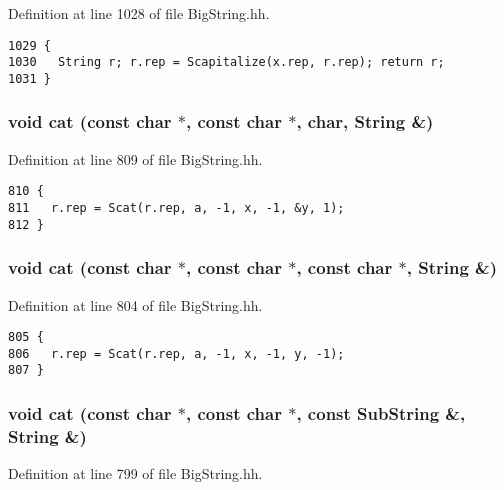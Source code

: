 Definition at line 1028 of file Big\-String.hh.



\footnotesize\begin{verbatim}1029 {
1030   String r; r.rep = Scapitalize(x.rep, r.rep); return r;
1031 }
\end{verbatim}\normalsize 
{}
\subsubsection{\setlength{\rightskip}{0pt plus 5cm}void cat (const char $\ast$, const char $\ast$, char, String \&)\hspace{0.3cm}{\tt  [friend]}}\label{classString_l36}




Definition at line 809 of file Big\-String.hh.



\footnotesize\begin{verbatim}810 {
811   r.rep = Scat(r.rep, a, -1, x, -1, &y, 1);
812 }
\end{verbatim}\normalsize 
{}
\subsubsection{\setlength{\rightskip}{0pt plus 5cm}void cat (const char $\ast$, const char $\ast$, const char $\ast$, String \&)\hspace{0.3cm}{\tt  [friend]}}\label{classString_l35}




Definition at line 804 of file Big\-String.hh.



\footnotesize\begin{verbatim}805 {
806   r.rep = Scat(r.rep, a, -1, x, -1, y, -1);
807 }
\end{verbatim}\normalsize 
{}
\subsubsection{\setlength{\rightskip}{0pt plus 5cm}void cat (const char $\ast$, const char $\ast$, const {\bf Sub\-String} \&, String \&)\hspace{0.3cm}{\tt  [friend]}}\label{classString_l34}




Definition at line 799 of file Big\-String.hh.



